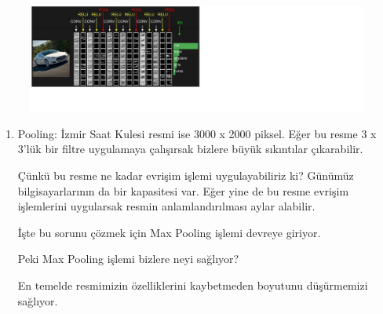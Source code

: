\documentclass[12pt,a4paper]{article}
\begin{document}
\begin{enumerate}
\begin{center}
\begin{figure}
				\centering
				\includegraphics{convex2.png}
			\end{figure}
		\clearpage
		\begin{enumerate}
			\item Pooling: İzmir Saat Kulesi resmi ise 3000 x 2000 piksel. Eğer bu resme 3 x 3'lük bir filtre uygulamaya çalışırsak bizlere büyük sıkıntılar çıkarabilir.
			
			Çünkü bu resme ne kadar evrişim işlemi uygulayabiliriz ki? Günümüz bilgisayarlarının da bir kapasitesi var. Eğer yine de bu resme evrişim işlemlerini uygularsak resmin anlamlandırılması aylar alabilir.
			
			İşte bu sorunu çözmek için Max Pooling işlemi devreye giriyor.
			
			Peki Max Pooling işlemi bizlere neyi sağlıyor?
			
			En temelde resmimizin özelliklerini kaybetmeden boyutunu düşürmemizi sağlıyor.
			

\end{enumerate}
\end{center}
\end{enumerate}
\end{document}
